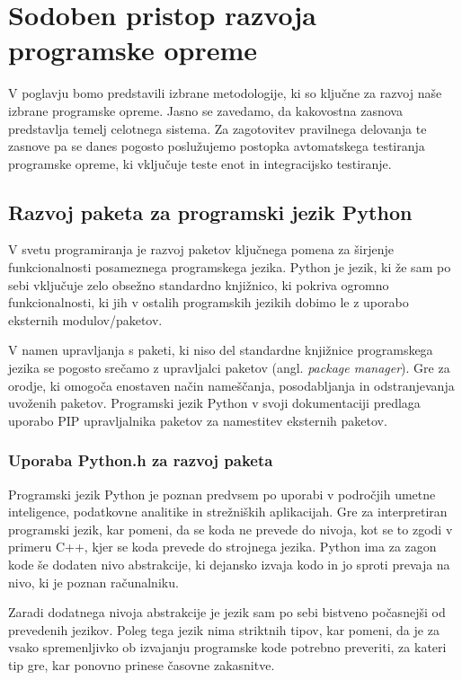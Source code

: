 \documentclass[a4paper,12pt,openright]{book}
\begin{document}
\chapter{Sodoben pristop razvoja programske opreme}
\label{ch1}

    V poglavju bomo predstavili izbrane metodologije, ki so ključne za razvoj naše izbrane programske opreme. Jasno se zavedamo, da kakovostna zasnova predstavlja temelj celotnega sistema. Za zagotovitev pravilnega delovanja te zasnove pa se danes pogosto poslužujemo postopka avtomatskega testiranja programske opreme, ki vključuje teste enot in integracijsko testiranje.

    \section{Razvoj paketa za programski jezik \newline Python}

    V svetu programiranja je razvoj paketov ključnega pomena za širjenje funkcionalnosti posameznega programskega jezika. Python je jezik, ki že sam po sebi vključuje zelo obsežno standardno knjižnico, ki pokriva ogromno funkcionalnosti, ki jih v ostalih programskih jezikih dobimo le z uporabo eksternih modulov/paketov.

    V namen upravljanja s paketi, ki niso del standardne knjižnice programskega jezika se pogosto srečamo z upravljalci paketov (angl. \textit{package manager}). Gre za orodje, ki omogoča enostaven način nameščanja, posodabljanja in odstranjevanja uvoženih paketov. Programski jezik Python v svoji dokumentaciji \cite{PY_PM} predlaga uporabo PIP \cite{PIP} upravljalnika paketov za namestitev eksternih paketov.
   
    \subsection{Uporaba Python.h za razvoj paketa}
   Programski jezik Python je poznan predvsem po uporabi v področjih umetne inteligence, podatkovne analitike in strežniških aplikacijah. Gre za interpretiran programski jezik, kar pomeni, da se koda ne prevede do nivoja, kot se to zgodi v primeru C++, kjer se koda prevede do strojnega jezika. Python ima za zagon kode še dodaten nivo abstrakcije, ki dejansko izvaja kodo in jo sproti prevaja na nivo, ki je poznan računalniku.

   Zaradi dodatnega nivoja abstrakcije je jezik sam po sebi bistveno počasnejši od prevedenih jezikov. Poleg tega jezik nima striktnih tipov, kar pomeni, da je za vsako spremenljivko ob izvajanju programske kode potrebno preveriti, za kateri tip gre, kar ponovno prinese časovne zakasnitve.
\end{document}
